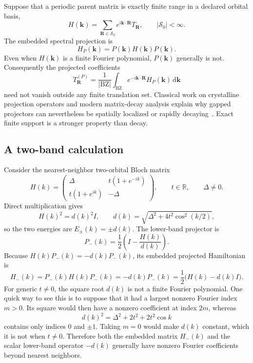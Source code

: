 Suppose that a periodic parent matrix is exactly finite range in a declared
orbital basis,
\begin{equation}
  H(\mathbf k)
  =\sum_{\mathbf R\in\mathcal S_0}
    e^{i\mathbf k\cdot\mathbf R}T_{\mathbf R},
  \qquad |\mathcal S_0|<\infty.
\end{equation}
The embedded spectral projection is
\begin{equation}
  H_P(\mathbf k)=P(\mathbf k)H(\mathbf k)P(\mathbf k).
\end{equation}
Even when \(H(\mathbf k)\) is a finite Fourier polynomial,
\(P(\mathbf k)\) generally is not. Consequently the projected coefficients
\begin{equation}
  T^{(P)}_{\mathbf R}
  =\frac{1}{|\mathrm{BZ}|}
    \int_{\mathrm{BZ}}
      e^{-i\mathbf k\cdot\mathbf R}H_P(\mathbf k)\,
      \mathrm{d}\mathbf k
\end{equation}
need not vanish outside any finite translation set. Classical work on
crystalline projection operators and modern matrix-decay analysis explain why
gapped projectors can nevertheless be spatially localized or rapidly
decaying~\cite{desCloizeaux1964,benzi2013}. Exact finite support is a stronger
property than decay.

\subsection{A two-band calculation}

Consider the nearest-neighbor two-orbital Bloch matrix
\begin{equation}
  H(k)=
  \begin{pmatrix}
    \Delta & t(1+e^{-ik})\\
    t(1+e^{ik}) & -\Delta
  \end{pmatrix},
  \qquad t\in\mathbb R,
  \qquad \Delta\neq0.
\end{equation}
Direct multiplication gives
\begin{equation}
  H(k)^2=d(k)^2I,
  \qquad
  d(k)=\sqrt{\Delta^2+4t^2\cos^2(k/2)},
\end{equation}
so the two energies are \(E_{\pm}(k)=\pm d(k)\). The lower-band projector is
\begin{equation}
  P_-(k)=\frac12\left(I-\frac{H(k)}{d(k)}\right).
\end{equation}
Because \(H(k)P_-(k)=-d(k)P_-(k)\), its embedded projected Hamiltonian is
\begin{equation}
  H_-(k)
  =P_-(k)H(k)P_-(k)
  =-d(k)P_-(k)
  =\frac12\bigl(H(k)-d(k)I\bigr).
\end{equation}
For generic \(t\neq0\), the square root \(d(k)\) is not a finite Fourier
polynomial. One quick way to see this is to suppose that it had a largest
nonzero Fourier index \(m>0\). Its square would then have a nonzero coefficient
at index \(2m\), whereas
\begin{equation}
  d(k)^2=\Delta^2+2t^2+2t^2\cos k
\end{equation}
contains only indices \(0\) and \(\pm1\). Taking \(m=0\) would make
\(d(k)\) constant, which it is not when \(t\neq0\). Therefore both the
embedded matrix \(H_-(k)\) and the scalar lower-band operator \(-d(k)\)
generally have nonzero Fourier coefficients beyond nearest neighbors.

